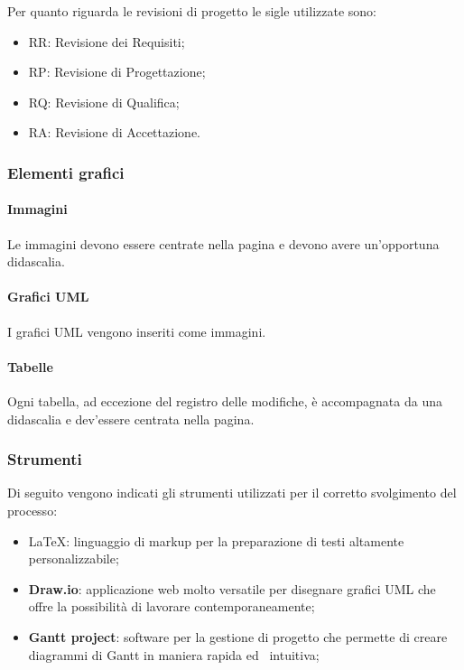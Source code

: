 Per quanto riguarda le revisioni di progetto le sigle utilizzate sono:
\begin{itemize}
    \item RR: Revisione dei Requisiti;
    \item RP: Revisione di Progettazione;
    \item RQ: Revisione di Qualifica;
    \item RA: Revisione di Accettazione.
\end{itemize}

\subsubsection{Elementi grafici}
\label{ssub:elementi_grafici}

\paragraph{Immagini}
\label{par:immagini}

Le immagini devono essere centrate nella pagina e devono avere un'opportuna didascalia.

\paragraph{Grafici UML}
\label{par:uml}

I grafici UML vengono inseriti come immagini.

\paragraph{Tabelle}
\label{par:tabelle}

Ogni tabella, ad eccezione del registro delle modifiche, è accompagnata da una didascalia e dev'essere centrata nella
pagina.

\subsubsection{Strumenti}
\label{ssub:strumenti}

Di seguito vengono indicati gli strumenti utilizzati per il corretto svolgimento del processo:
\begin{itemize}
	\item \LaTeX: linguaggio di markup per la preparazione di testi altamente personalizzabile;
	\item \textbf{Draw.io}: applicazione web molto versatile per disegnare grafici UML che offre la possibilità di lavorare
		contemporaneamente;
	\item \textbf{Gantt project}: software per la gestione di progetto che permette di creare diagrammi di Gantt in maniera rapida ed \
		intuitiva;
\end{itemize}

